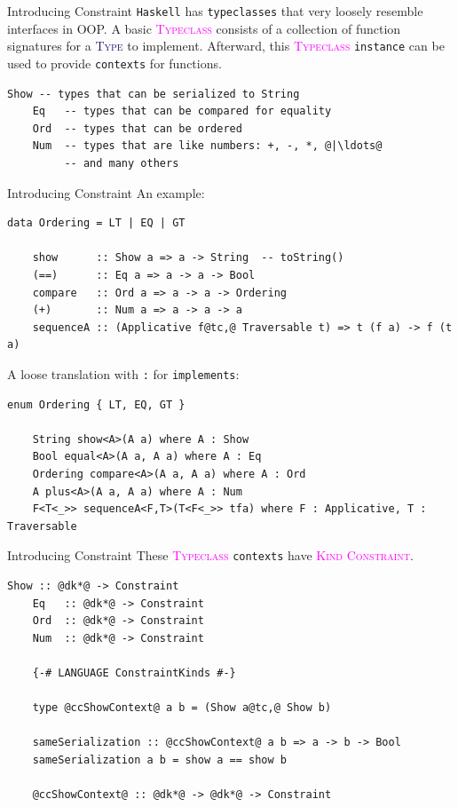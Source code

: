 \documentclass[xcolor={usenames,dvipsnames}]{beamer}
\newcommand{\htycon}[1]{\textcolor{MidnightBlue}{\textsc{#1}}}
\newcommand{\hkind}[1]{\textcolor{Fuchsia}{\textsc{#1}}}
\newcommand{\hclass}[1]{\textcolor{Magenta}{\textsc{#1}}}
\begin{document}
\begin{frame}[fragile]{Introducing Constraint}
  \texttt{Haskell} has \texttt{typeclasses} that very loosely resemble interfaces in OOP. A basic \hclass{Typeclass} consists of a collection of function signatures for a \htycon{Type} to implement. Afterward, this \hclass{Typeclass} \texttt{instance} can be used to provide \texttt{contexts} for functions.
  \begin{lstlisting}[style=hask]
    Show -- types that can be serialized to String
    Eq   -- types that can be compared for equality
    Ord  -- types that can be ordered
    Num  -- types that are like numbers: +, -, *, @|\ldots@
         -- and many others
  \end{lstlisting}
\end{frame}

\begin{frame}[fragile]{Introducing Constraint}
  An example:
  \begin{lstlisting}[style=hask]
    data Ordering = LT | EQ | GT

    show      :: Show a => a -> String  -- toString()
    (==)      :: Eq a => a -> a -> Bool
    compare   :: Ord a => a -> a -> Ordering
    (+)       :: Num a => a -> a -> a
    sequenceA :: (Applicative f@tc,@ Traversable t) => t (f a) -> f (t a)
  \end{lstlisting}

  A loose translation with \texttt{:} for \texttt{implements}:
  \begin{lstlisting}[style=hask]
    enum Ordering { LT, EQ, GT }

    String show<A>(A a) where A : Show
    Bool equal<A>(A a, A a) where A : Eq
    Ordering compare<A>(A a, A a) where A : Ord
    A plus<A>(A a, A a) where A : Num
    F<T<_>> sequenceA<F,T>(T<F<_>> tfa) where F : Applicative, T : Traversable
  \end{lstlisting}
\end{frame}

\begin{frame}[fragile]{Introducing Constraint}
  These \hclass{Typeclass} \texttt{contexts} have \hkind{Kind} \hkind{Constraint}.
  \begin{lstlisting}[style=hask]
    Show :: @dk*@ -> Constraint
    Eq   :: @dk*@ -> Constraint
    Ord  :: @dk*@ -> Constraint
    Num  :: @dk*@ -> Constraint

    {-# LANGUAGE ConstraintKinds #-}

    type @ccShowContext@ a b = (Show a@tc,@ Show b)

    sameSerialization :: @ccShowContext@ a b => a -> b -> Bool
    sameSerialization a b = show a == show b

    @ccShowContext@ :: @dk*@ -> @dk*@ -> Constraint
  \end{lstlisting}
\end{frame}
\end{document}
